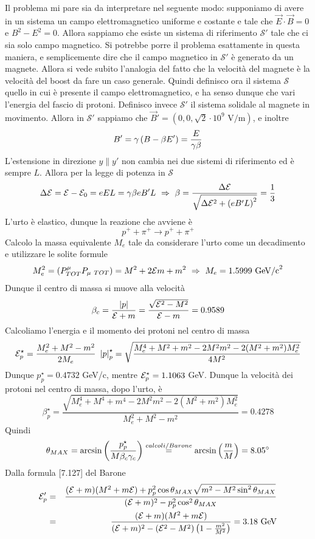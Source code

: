 \documentclass[12pt,twoside,a4]{article}
\begin{document}
\begin{solution}
Il problema mi pare sia da interpretare nel seguente modo: supponiamo di avere in un sistema un campo elettromagnetico uniforme e costante e tale che $\vec E \cdot \vec B = 0$ e $B^2 - E^2 = 0$. Allora sappiamo che esiste un sistema di riferimento $\mathcal{S}'$ tale che ci sia solo campo magnetico. Si potrebbe porre il problema esattamente in questa maniera, e semplicemente dire che il campo magnetico in $\mathcal{S}'$ è generato da un magnete. Allora si vede subito l'analogia del fatto che la velocità  del magnete è la velocità  del boost da fare un caso generale. Quindi definisco ora il sistema $\mathcal{S}$ quello in cui è presente il campo elettromagnetico, e ha senso dunque che vari l'energia del fascio di protoni. Definisco invece $\mathcal{S}'$ il sistema solidale al magnete in movimento. Allora in $\mathcal{S}'$ sappiamo che $\vec{B}' = (0,0,\sqrt{2} \cdot 10^9 \mbox{ V/m})$, e inoltre
$$ B' = \gamma \left({ B - \beta E'}\right) = \frac{E}{\gamma \beta}$$
L'estensione in direzione $y \parallel y'$ non cambia nei due sistemi di riferimento ed è sempre $L$. Allora per la legge di potenza in $\mathcal{S}$
$$ \Delta \mathcal{E} = \mathcal{E} - \mathcal{E}_0 = e E L = \gamma \beta e B' L  \  \Rightarrow  \  \beta = \frac{\Delta \mathcal{E}}{\sqrt{\Delta \mathcal{E}^2 + \left({e B' L}\right)^2}} = \frac{1}{3}$$
L'urto è elastico, dunque la reazione che avviene è 
$$ p^+ + \pi^+ \longrightarrow p^+ + \pi^+ $$
Calcolo la massa equivalente $M_e$ tale da considerare l'urto come un decadimento e utilizzare le solite formule
$$ M_e^2 = (P^\mu_{TOT} P_{\mu \mbox{ } TOT}) = M^2 + 2 \mathcal{E} m + m^2  \  \Rightarrow  \  M_e = 1.5999 \mbox{ GeV/c}^2$$
Dunque il centro di massa si muove alla velocità 
$$ \beta_c = \frac{\left| {p} \right|}{\mathcal{E} + m} = \frac{\sqrt{\mathcal{E}^2-M^2}}{\mathcal{E}-m} = 0.9589 $$
Calcoliamo l'energia e il momento dei protoni nel centro di massa
$$ \mathcal{E}^\star_p = \frac{M_e^2 + M^2 - m^2}{2M_e}  \  \left| {p} \right|^\star_p = \sqrt{\frac{M_e^4 + M^2 + m^2 - 2M^2 m^2 - 2(M^2 + m^2)M^2_e}{4M^2}}$$
Dunque $p^\star_p = 0.4732$ GeV/c, mentre $\mathcal{E}^\star_p = 1.1063$ GeV.
Dunque la velocità  dei protoni nel centro di massa, dopo l'urto, è
$$ \beta_p^\star = \frac{\sqrt{M_e^4 + M^4 + m^4 - 2M^2 m^2 - 2(M^2 + m^2)M^2_e}}{M_e^2 + M^2 - m^2}  = 0.4278 $$
Quindi 
$$ \theta_{MAX} = \arcsin \left({ \frac{p^\star_p}{M \beta_c \gamma_c}}\right) \overset{calcoli/Barone}{=} \arcsin \left({\frac{m}{M}}\right)=8.05^\circ$$
Dalla formula [7.127] del Barone
\begin{eqnarray*} 
\mathcal{E}'_p & = & \frac{(\mathcal{E} + m)(M^2 + m \mathcal{E}) + p_p^2 \cos \theta_{MAX} \sqrt{m^2 - M^2 \sin^2 \theta_{MAX}}}{(\mathcal{E} + m)^2 - p^2_p \cos^2 \theta_{MAX}} \\
& = & \frac{(\mathcal{E} + m)(M^2 + m \mathcal{E})}{(\mathcal{E} + m)^2 - (\mathcal{E}^2 - M^2) \left({1 - \frac{m^2}{M^2}}\right)} = 3.18 \mbox{ GeV}
\end{eqnarray*}
\end{solution}
\end{document}
